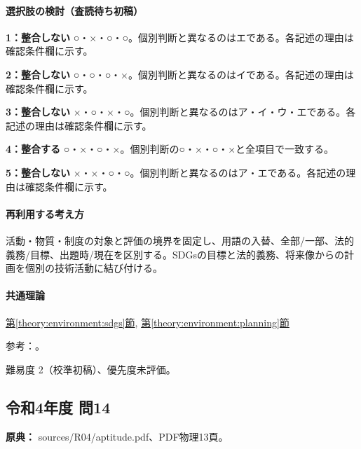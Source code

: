 \paragraph{選択肢の検討（査読待ち初稿）}\mbox{}\par

\noindent\textbf{1：整合しない} ○・×・○・○。個別判断と異なるのはエである。各記述の理由は確認条件欄に示す。\par

\noindent\textbf{2：整合しない} ○・○・○・×。個別判断と異なるのはイである。各記述の理由は確認条件欄に示す。\par

\noindent\textbf{3：整合しない} ×・○・×・○。個別判断と異なるのはア・イ・ウ・エである。各記述の理由は確認条件欄に示す。\par

\noindent\textbf{4：整合する} ○・×・○・×。個別判断の○・×・○・×と全項目で一致する。\par

\noindent\textbf{5：整合しない} ×・×・○・○。個別判断と異なるのはア・エである。各記述の理由は確認条件欄に示す。\par

\paragraph{再利用する考え方} 活動・物質・制度の対象と評価の境界を固定し、用語の入替、全部/一部、法的義務/目標、出題時/現在を区別する。SDGsの目標と法的義務、将来像からの計画を個別の技術活動に結び付ける。

\paragraph{共通理論} \hyperref[theory:environment:sdgs]{第\ref*{theory:environment:sdgs}節}, \hyperref[theory:environment:planning]{第\ref*{theory:environment:planning}節}

\par 参考：\cite{env_sdgs_agenda,env_sdgs_binding,env_sdgs2016}。

\par 難易度 2（校準初稿）、優先度未評価。

\subsection{令和4年度 問14}
\label{q:r04-reg-apt-14}

\noindent\textbf{原典：} sources/R04/aptitude.pdf、PDF物理13頁。


